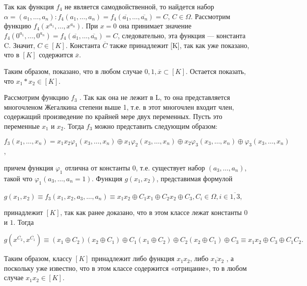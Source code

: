 \begin{proofs}[Э. Пост]
\begin{dokvo}
		Так как функция $f_{4}$ не является самодвойственной, то найдется набор $\alpha = (a_{1}, \ldots , a_{n}) : f_{4}(a_{1}, \ldots, a_{n}) = f_{4}(\overline{a_{1}}, \ldots,\overline{ a_{n}})=C$, $ C \in \Omega$. Рассмотрим функцию $f_{4}(x^{a_{1}}, \ldots, x^{a_{n}})$. При $x =0$ она принимает значение $f_{4}(0^{a_{1}}, \ldots, 0^{a_{n}}) = f_{4}(\overline{a_{1}}, \ldots, \overline{a_{n}}) = C$, следовательно, эта функция — константа C. Значит, $C \in [K]$. Константа  $\overline{C}$  также принадлежит [K], так как уже показано, что в $[K]$ содержится $\overline{x}$.

		Таким образом, показано, что в любом случае $ {0, 1, \overline{x}} \subset [K]$.  Остается показать, что  $x_{1}*x_{2} \in [K]$.

		Рассмотрим функцию $f_{3}$ . Так как она не лежит в L, то она представляется многочленом Жегалкина степени выше 1, т.е. в этот многочлен входит член, содержащий произведение по крайней мере двух переменных. Пусть это переменные $x_{1}$ и $x_{2}$. Тогда $f_{3}$ можно представить следующим образом:

		$f_{3}(x_{1}, \ldots, x_{n}) = x_{1}x_{2}\varphi_{1}(x_{3}, \ldots, x_{n})\oplus x_{1}\varphi_{2}(x_{3}, \ldots, x_{n})\oplus x_{2}\varphi_{3}(x_{3}, \ldots, x_{n})\oplus \varphi_{3}(x_{3}, \ldots, x_{n})$,

		причем функция $\varphi_{1}$  отлична от константы 0, т.е. существует набор $(a_{3}, \ldots, a_{n})$, такой что $\varphi_{1} (a_{3}, \ldots, a_{n} = 1)$. Функция $ g(x_{1},x_{2})$,  представимая формулой

		$ g(x_{1},x_{2}) \equiv f_{3}(x_{1}, x_{2}, a_{3}, \ldots, a_{n}) \equiv x_{1}x_{2} \oplus C_{1}x_{1} \oplus C_{2}x_{2} \oplus C_{3}, C_{i} \in \Omega, i \in \overline{1,3}$,

		принадлежит $[K]$, так как ранее доказано, что в этом классе лежат константы $0$ и $1$. Тогда

		$ g(x^{\overline{C_{2}}},x^{\overline{C_{1}}}) \equiv (x_{1} \oplus C_{2})(x_{2} \oplus C_{1}) \oplus C_{1}(x_{1} \oplus C_{2}) \oplus C_{2}(x_{2} \oplus C_{1}) \oplus C_{3} \equiv x_{1}x_{2} \oplus C_{3} \oplus C_{1}C_{2}.$

		Таким образом, классу $[K]$ принадлежит либо функция $ x_{1}x_{2}$, либо $\overline{x_{1}x_{2}}$ , а поскольку уже известно, что в этом классе содержится «отрицание», то в любом случае $ x_{1}x_{2} \in [K]$.

	\end{dokvo}
\end{proofs}


